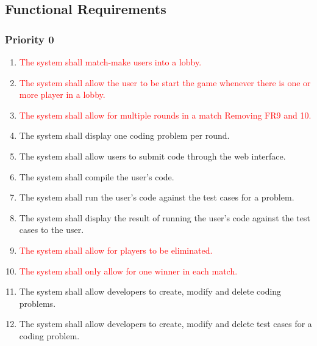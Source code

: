\documentclass[12pt, titlepage]{article}
\begin{document}
\subsection{Functional Requirements}
\subsubsection{Priority 0}
\begin{enumerate}[label=FR.\arabic*]
    \item \textcolor{red}{The system shall match-make users into a lobby.} \label{FR.1}
    \item \textcolor{red}{The system shall allow the user to be start the game whenever there is one or more player in a lobby.} \label{FR.2}
    \item \textcolor{red}{The system shall allow for multiple rounds in a match
Removing FR9 and 10.} \label{FR.3}
    \item The system shall display one coding problem per round. \label{FR.4}
    \item The system shall allow users to submit code through the web interface. \label{FR.5}
    \item The system shall compile the user's code. \label{FR.6}
    \item The system shall run the user's code against the test cases for a problem.  \label{FR.7}
    \item The system shall display the result of running the user's code against the test cases to the user.  \label{FR.8}
    \item \textcolor{red}{The system shall allow for players to be eliminated.}  \label{FR.9}
    \item \textcolor{red}{The system shall only allow for one winner in each match.} \label{FR.10}
    \item The system shall allow developers to create, modify and delete coding problems.  \label{FR.11}
    \item The system shall allow developers to create, modify and delete test cases for a coding problem. \label{FR.12}

\end{enumerate}
\end{document}
